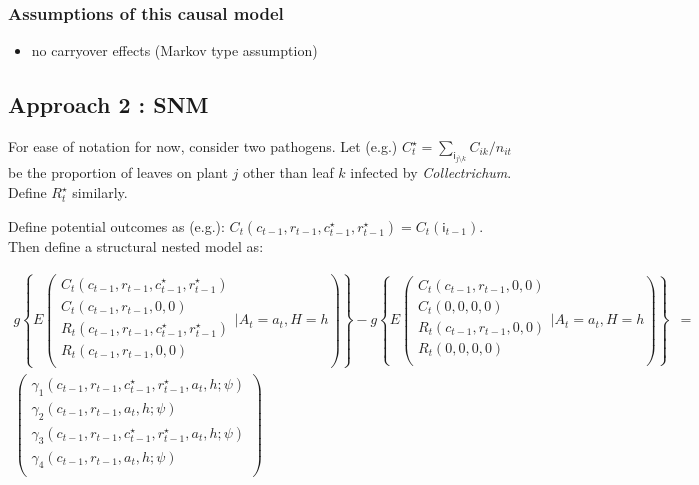 \documentclass[]{article}
\providecommand{\tightlist}{%
  \setlength{\itemsep}{0pt}\setlength{\parskip}{0pt}}
\begin{document}
\hypertarget{causal_assumptions}{%
\subsubsection{Assumptions of this causal
model}\label{causal_assumptions}}

\begin{itemize}
\tightlist
\item
  no carryover effects (Markov type assumption)
\end{itemize}

\hypertarget{approach-2-snm}{%
\subsection{Approach 2 : SNM}\label{approach-2-snm}}

For ease of notation for now, consider two pathogens. Let (e.g.)
\(C^{\star}_t = \sum_{\mathsf{i}_{j \setminus k}} C_{ik}/n_{it}\) be the
proportion of leaves on plant \(j\) other than leaf \(k\) infected by
\emph{Collectrichum}. Define \(R^{\star}_t\) similarly.

Define potential outcomes as (e.g.):
\(C_t(c_{t-1}, r_{t-1}, c^{\star}_{t-1}, r^{\star}_{t-1}) = C_t(\mathsf{i}_{t -1})\).
Then define a structural nested model as:

\begin{align*}
g \left\{ E \left( 
 \begin{array}{l}
  C_t(c_{t-1}, r_{t-1}, c^{\star}_{t-1}, r^{\star}_{t-1}) \\
  C_t(c_{t-1}, r_{t-1}, 0, 0) \\
  R_t(c_{t-1}, r_{t-1}, c^{\star}_{t-1}, r^{\star}_{t-1}) \\
  R_t(c_{t-1}, r_{t-1}, 0, 0) \\
 \end{array} \bigg| A_t = a_t, H = h
\right)  \right\} -  
g \left\{ E \left( 
 \begin{array}{l}
  C_t(c_{t-1}, r_{t-1}, 0, 0) \\
  C_t(0, 0, 0, 0) \\
  R_t(c_{t-1}, r_{t-1}, 0, 0) \\
  R_t(0, 0, 0, 0) \\
 \end{array} \bigg| A_t = a_t, H = h
\right)  \right\} &= \\ 
\begin{pmatrix}
\gamma_1(c_{t-1}, r_{t-1}, c^{\star}_{t-1}, r^{\star}_{t-1}, a_t, h; \psi) \\
\gamma_2(c_{t-1}, r_{t-1}, a_t, h; \psi) \\
\gamma_3(c_{t-1}, r_{t-1}, c^{\star}_{t-1}, r^{\star}_{t-1}, a_t, h; \psi) \\
\gamma_4(c_{t-1}, r_{t-1}, a_t, h; \psi) \\
\end{pmatrix}
\end{align*}
\end{document}
